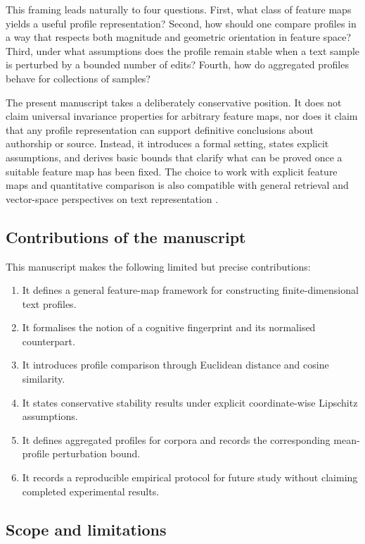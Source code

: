 \documentclass[11pt]{article}
\begin{document}
This framing leads naturally to four questions. First, what class of feature maps yields a useful profile representation? Second, how should one compare profiles in a way that respects both magnitude and geometric orientation in feature space? Third, under what assumptions does the profile remain stable when a text sample is perturbed by a bounded number of edits? Fourth, how do aggregated profiles behave for collections of samples?

The present manuscript takes a deliberately conservative position. It does not claim universal invariance properties for arbitrary feature maps, nor does it claim that any profile representation can support definitive conclusions about authorship or source. Instead, it introduces a formal setting, states explicit assumptions, and derives basic bounds that clarify what can be proved once a suitable feature map has been fixed. The choice to work with explicit feature maps and quantitative comparison is also compatible with general retrieval and vector-space perspectives on text representation \cite{ManningEtAl2008}.

\subsection{Contributions of the manuscript}

This manuscript makes the following limited but precise contributions:
\begin{enumerate}[label=\arabic*.]
    \item It defines a general feature-map framework for constructing finite-dimensional text profiles.
    \item It formalises the notion of a cognitive fingerprint and its normalised counterpart.
    \item It introduces profile comparison through Euclidean distance and cosine similarity.
    \item It states conservative stability results under explicit coordinate-wise Lipschitz assumptions.
    \item It defines aggregated profiles for corpora and records the corresponding mean-profile perturbation bound.
    \item It records a reproducible empirical protocol for future study without claiming completed experimental results.
\end{enumerate}

\subsection{Scope and limitations}
\end{document}
